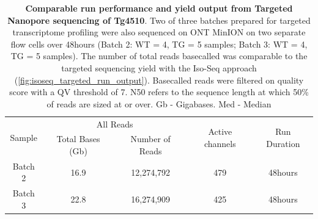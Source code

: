 \vspace{1cm}
\begin{table}[ht]
	\captionsetup{justification=raggedright,width=0.95\textwidth}
	\caption[Run Yield Output from Targeted Transcriptome Nanopore Sequencing of Tg4510]%
	{\textbf{Comparable run performance and yield output from Targeted Nanopore sequencing of Tg4510}. Two of three batches prepared for targeted transcriptome profiling were also sequenced on ONT MinION on two separate flow cells over 48hours (Batch 2: WT = 4, TG = 5 samples; Batch 3: WT = 4, TG = 5 samples). The number of total reads basecalled was comparable to the targeted sequencing yield with the Iso-Seq approach (\cref{fig:isoseq_targeted_run_output}). Basecalled reads were filtered on quality score with a QV threshold of 7. N50 refers to the sequence length at which 50\% of reads are sized at or over. Gb - Gigabases. Med - Median}
	\label{tab:ont_targetedrun_output}
	\centering
	\begin{tabularx}{0.95\textwidth}{@{}ccccc@{}}
		\toprule
		\multirow{2}{*}{Sample} & \multicolumn{2}{c}{All Reads}      & \multirow{2}{*}{Active channels} & \multirow{2}{*}{Run Duration} \\ \cmidrule(lr){2-3}
		& Total Bases (Gb) & Number of Reads &                                  &                               \\ \midrule
		Batch 2                     & 16.9             & 12,274,792       & 479                              & 48hours                       \\
		Batch 3                     & 22.8             & 16,274,909       & 425                              & 48hours                       \\ \bottomrule
	\end{tabularx}
	\vspace{1cm}


\end{table}
